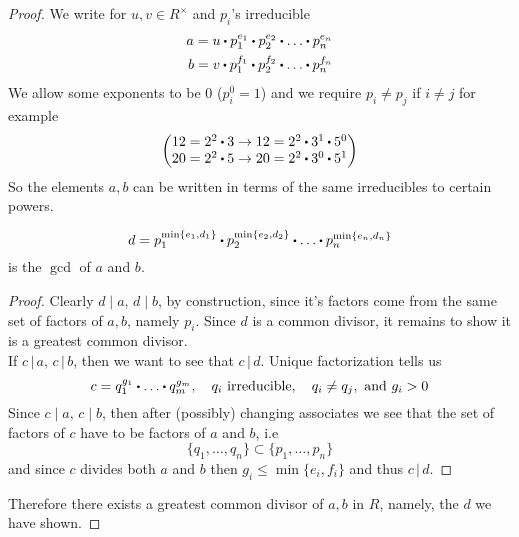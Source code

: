 \documentclass[../Main.tex]{subfiles}
\begin{document}
\begin{proof}
	We write for $u,v\in R^\times$ and $p_i$'s irreducible
	\begin{align*}
	a=u\rdot p_1^{e_1}\rdot p_2^{e_2}\rdot \dots \rdot p_n^{e_n}\\
	b=v\rdot p_1^{f_1}\rdot p_2^{f_2}\rdot \dots \rdot p_n^{f_n}
	\end{align*}
	We allow some exponents to be $0$ ($p_i^0=1$) and we require $p_i\ne p_j$ if $i\ne j$ for example
	\[\begin{pmatrix}
	12=2^2\rdot 3 \to 12= 2^2\rdot 3^1\rdot 5^0 \\
	20=2^2\rdot 5 \to 20 =2^2\rdot 3^0\rdot 5^1 
	\end{pmatrix}\]
	So the elements $a,b$ can be written in terms of the same irreducibles to certain powers.
	\begin{claim}
		\[d=p_1^{\min\{e_1,d_1\}}\rdot p_2^{\min\{e_2,d_2\}}\rdot \dots \rdot p_n^{\min\{e_n,d_n\}}\]
		is the $\gcd$ of $a$ and $b$.
	\end{claim}
	\begin{proof}
		Clearly $d\mid a,\, d\mid b$, by construction, since it's factors come from the same set of factors of $a,b$, namely $p_i$. Since $d$ is a common divisor, it remains to show it is a greatest common divisor.\\
		If $c\,|\, a, \, c\,|\,b$, then we want to see that $c\,|\, d$. 
		Unique factorization tells us
		\[c=q_1^{g_1}\rdot \dots \rdot q_m^{g_m}, \quad q_i \text{ irreducible},\quad  q_i\ne q_j, \text{ and } g_i>0\]
		Since $c\mid a,\, c\mid b$, then after (possibly) changing associates we see that the set of factors of $c$ have to be factors of $a$ and $b$, i.e
		\[\{q_1,\dots,q_n\}\subset \{p_1,\dots,p_n\}\]
		and since $c$ divides both $a$ and $b$ then $g_i\le \min\{e_i,f_i\}$ and thus $c\,|\,d$.
	\end{proof}
	Therefore there exists a greatest common divisor of $a,b$ in $R$, namely, the $d$ we have shown.
\end{proof}
\end{document}
